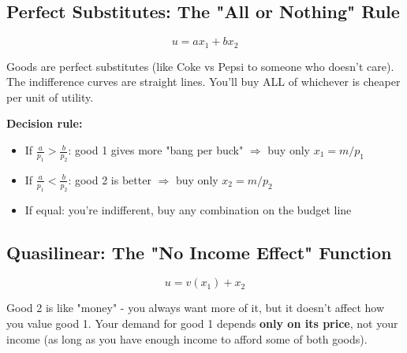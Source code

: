 \documentclass[11pt]{article}
\begin{document}
\subsection{Perfect Substitutes: The "All or Nothing" Rule}

$$u = ax_1 + bx_2$$

\begin{center}
\end{center}

\begin{intuition}
Goods are perfect substitutes (like Coke vs Pepsi to someone who doesn't care). The indifference curves are straight lines. You'll buy ALL of whichever is cheaper per unit of utility.
\end{intuition}

\begin{steps}
\textbf{Decision rule:}
\begin{itemize}
    \item If $\frac{a}{p_1} > \frac{b}{p_2}$: good 1 gives more "bang per buck" $\Rightarrow$ buy only $x_1 = m/p_1$
    \item If $\frac{a}{p_1} < \frac{b}{p_2}$: good 2 is better $\Rightarrow$ buy only $x_2 = m/p_2$
    \item If equal: you're indifferent, buy any combination on the budget line
\end{itemize}
\end{steps}

\subsection{Quasilinear: The "No Income Effect" Function}

$$u = v(x_1) + x_2$$

\begin{intuition}
Good 2 is like "money" - you always want more of it, but it doesn't affect how you value good 1. Your demand for good 1 depends \textbf{only on its price}, not your income (as long as you have enough income to afford some of both goods).
\end{intuition}
\end{document}
